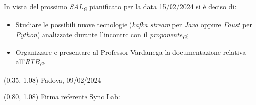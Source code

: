 \documentclass{article}
\begin{document}
    In vista del prossimo \textit{SAL}\textsubscript{\textit{G}} pianificato per la data 15/02/2024 si è deciso di: 
    \begin{itemize}
        \item Studiare le possibili nuove tecnologie (\textit{kafka stream} per \textit{Java} oppure \textit{Faust} per \textit{Python}) analizzate durante l'incontro con il \textit{proponente}\textsubscript{\textit{G}}; 
        \item Organizzare e presentare al Professor Vardanega la documentazione relativa all'\textit{RTB}\textsubscript{\textit{G}}.
    \end{itemize}

\begin{textblock*}{\textwidth}(0.35\textwidth, 1.08\textheight)
    Padova, 09/02/2024
\end{textblock*}

\begin{textblock*}{\textwidth}(0.80\textwidth, 1.08\textheight)
        Firma referente Sync Lab:
\end{textblock*}
\end{document}
